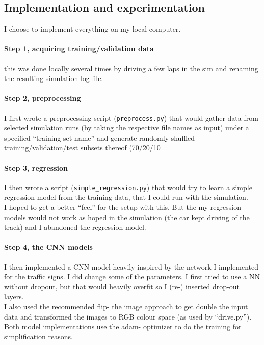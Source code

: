 \documentclass[a4paper]{article}
\begin{document}
\subsection{Implementation and experimentation}
I choose to implement everything on my local computer.

\paragraph{Step 1, acquiring training/validation data}
this was done locally several times by driving a few laps in the sim and
renaming the resulting simulation-log file.

\paragraph{Step 2, preprocessing}
I first wrote a preprocessing script (\texttt{preprocess.py}) that would gather
data from selected simulation runs (by taking the respective file names as input)
under a specified \enquote{training-set-name} and generate randomly shuffled
training/validation/test subsets thereof (70/20/10 %

\paragraph{Step 3, regression}
I then wrote a script (\texttt{simple\_regression.py}) that would try to learn a
simple regression model from the training data, that I could run with the simulation.\\
I hoped to get a better \enquote{feel} for the setup with this. But the my regression models
would not work as hoped in the simulation (the car kept driving of the track) and I
abandoned the regression model.

\paragraph{Step 4, the CNN models}
I then implemented a CNN model heavily inspired by the network I implemented for
the traffic signs. I did change some of the parameters. I first tried to use
a NN without dropout, but that would heavily overfit so I (re-) inserted drop-out layers.
\\
I also used the recommended flip- the image approach to get double the input data
and transformed the images to RGB colour space (as used by \enquote{drive.py}).
Both model implementations use the adam- optimizer to do the training for
simplification reasons.
\end{document}

